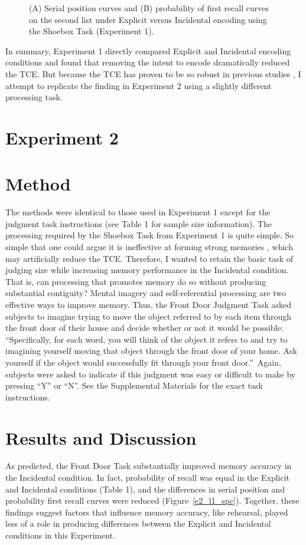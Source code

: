\documentclass[man,natbib,floatsintext]{apa6} %
\begin{document}
\begin{figure}
\caption{(A) Serial position curves and (B) probability of first recall curves on the second list under Explicit versus Incidental encoding using the Shoebox Task (Experiment 1).\spcpaneltext}
\label{e1_l2_spc}
\end{figure}

In summary, Experiment 1 directly compared Explicit and Incidental encoding conditions and found that removing the intent to encode dramatically reduced the TCE.  But because the TCE has proven to be so robust in previous studies \citep{HealKaha17}, I attempt to replicate the finding in Experiment 2 using a slightly different processing task.

\section{Experiment 2}
\section{Method}
The methods were identical to those used in Experiment 1 except for the judgment task instructions (see Table 1 for sample size information).
The processing required by the Shoebox Task from Experiment 1 is quite simple. So simple that one could argue it is  ineffective at forming strong memories \citep{EaglLeit64}, which may artificially reduce the TCE. Therefore, I wanted to retain the basic task of judging size while increasing memory performance in the Incidental condition. That is, can processing that promotes memory do so without producing substantial contiguity? Mental imagery and self-referential processing are two effective ways to improve memory. Thus, the Front Door Judgment Task asked subjects to imagine trying to move the object referred to by each item through the front door of their house and decide whether or not it would be possible: ``Specifically, for each word, you will think of the object it refers to and try to imagining yourself moving that object through the front door of your home. Ask yourself if the object would successfully fit through your front door.''~Again, subjects were asked to indicate if this judgment was easy or difficult to make by pressing ``Y'' or ``N''. See the Supplemental Materials for the exact task instructions.

\section{Results and Discussion}
As predicted, the Front Door Task substantially improved memory accuracy in the Incidental condition. In fact, probability of recall was equal in the Explicit and Incidental conditions (Table 1),  and the differences in serial position and probability first recall curves were reduced (Figure~\ref{e2_l1_spc}). Together, these findings suggest factors that influence memory accuracy, like rehearsal, played less of a role in producing differences between the Explicit and Incidental conditions in this Experiment.
\end{document}
